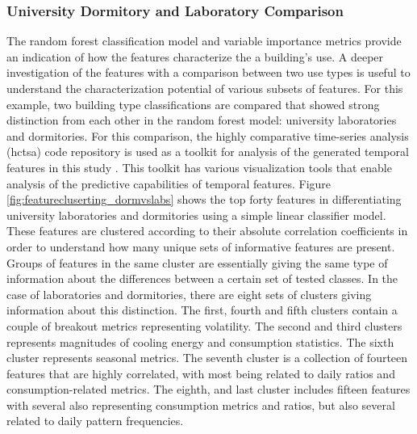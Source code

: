 \subsubsection{University Dormitory and Laboratory Comparison}
\label{sec:dormvslab}

The random forest classification model and variable importance metrics provide an indication of how the features characterize the a building's use. A deeper investigation of the features with a comparison between two use types is useful to understand the characterization potential of various subsets of features. For this example, two building type classifications are compared that showed strong distinction from each other in the random forest model: university laboratories and dormitories. For this comparison, the highly comparative time-series analysis (hctsa) code repository is used as a toolkit for analysis of the generated temporal features in this study \cite{Fulcher_2013}. This toolkit has various visualization tools that enable analysis of the predictive capabilities of temporal features. Figure \ref{fig:featurecluserting_dormvslabs} shows the top forty features in differentiating university laboratories and dormitories using a simple linear classifier model. These features are clustered according to their absolute correlation coefficients in order to understand how many unique sets of informative features are present. Groups of features in the same cluster are essentially giving the same type of information about the differences between a certain set of tested classes. In the case of laboratories and dormitories, there are eight sets of clusters giving information about this distinction. The first, fourth and fifth clusters contain a couple of breakout metrics representing volatility. The second and third clusters represents magnitudes of cooling energy and consumption statistics. The sixth cluster represents seasonal metrics. The seventh cluster is a collection of fourteen features that are highly correlated, with most being related to daily ratios and consumption-related metrics. The eighth, and last cluster includes fifteen features with several also representing consumption metrics and ratios, but also several related to daily pattern frequencies.



